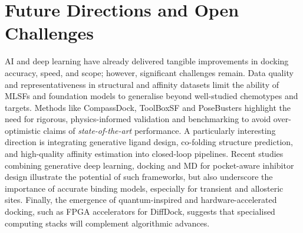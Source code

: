 \documentclass[12pt]{article}
\begin{document}
\section{Future Directions and Open Challenges}

AI and deep learning have already delivered tangible improvements in docking accuracy, speed, and scope; however, significant challenges remain. Data quality and representativeness in structural and affinity datasets limit the ability of MLSFs and foundation models to generalise beyond well-studied chemotypes and targets. Methods like CompassDock\cite{CH13_compassdock2024}, ToolBoxSF\cite{CH13_durant2025robustly} and PoseBusters\cite{CH13_posebusters2023} highlight the need for rigorous, physics-informed validation and benchmarking to avoid over-optimistic claims of \emph{state-of-the-art} performance. A particularly interesting direction is integrating generative ligand design, co-folding structure prediction, and high-quality affinity estimation into closed-loop pipelines. Recent studies combining generative deep learning, docking and MD for pocket-aware inhibitor design illustrate the potential of such frameworks, but also underscore the importance of accurate binding models, especially for transient and allosteric sites\cite{CH13_btkgen2025,CH13_deepallostery2024,CH13_robinson2022artificial}. Finally, the emergence of quantum-inspired and hardware-accelerated docking, such as FPGA accelerators for DiffDock, suggests that specialised computing stacks will complement algorithmic advances\cite{CH13_quantuminspired2024,CH13_diffdockfpga2025}.



\end{document}
